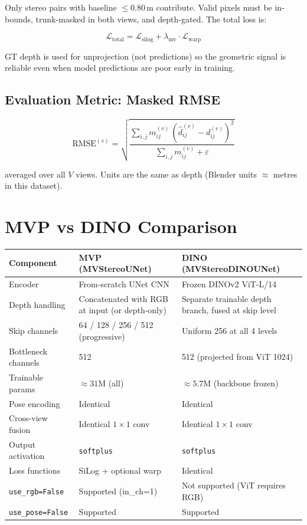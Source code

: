 \documentclass[11pt]{article}
\begin{document}
Only stereo pairs with baseline $\leq 0.80\,$m contribute.  Valid pixels must
be in-bounds, trunk-masked in both views, and depth-gated.  The total loss is:

\[
\mathcal{L}_\text{total}
= \mathcal{L}_\text{silog} + \lambda_\text{mv} \cdot \mathcal{L}_\text{warp}
\]

GT depth is used for unprojection (not predictions) so the geometric signal is
reliable even when model predictions are poor early in training.

\subsection{Evaluation Metric: Masked RMSE}

\[
\text{RMSE}^{(v)} = \sqrt{\frac{\sum_{i,j} m^{(v)}_{ij}\,(\hat{d}_{ij}^{(v)} - d_{ij}^{(v)})^2}{\sum_{i,j} m^{(v)}_{ij} + \varepsilon}}
\]

averaged over all $V$ views.  Units are the same as depth (Blender units
$\approx$ metres in this dataset).

\section{MVP vs DINO Comparison}

\begin{center}
\begin{tabular}{lp{4.5cm}p{4.5cm}}
\toprule
\textbf{Component} & \textbf{MVP (MVStereoUNet)} & \textbf{DINO (MVStereoDINOUNet)} \\
\midrule
Encoder & From-scratch UNet CNN & Frozen DINOv2 ViT-L/14 \\
Depth handling & Concatenated with RGB at input (or depth-only) & Separate trainable depth branch, fused at skip level \\
Skip channels & 64 / 128 / 256 / 512 (progressive) & Uniform 256 at all 4 levels \\
Bottleneck channels & 512 & 512 (projected from ViT 1024) \\
Trainable params & $\approx 31$M (all) & $\approx 5.7$M (backbone frozen) \\
Pose encoding & Identical & Identical \\
Cross-view fusion & Identical $1\times1$ conv & Identical $1\times1$ conv \\
Output activation & \texttt{softplus} & \texttt{softplus} \\
Loss functions & SiLog + optional warp & Identical \\
\texttt{use\_rgb=False} & Supported (in\_ch=1) & Not supported (ViT requires RGB) \\
\texttt{use\_pose=False} & Supported & Supported \\
\bottomrule
\end{tabular}
\end{center}
\end{document}
